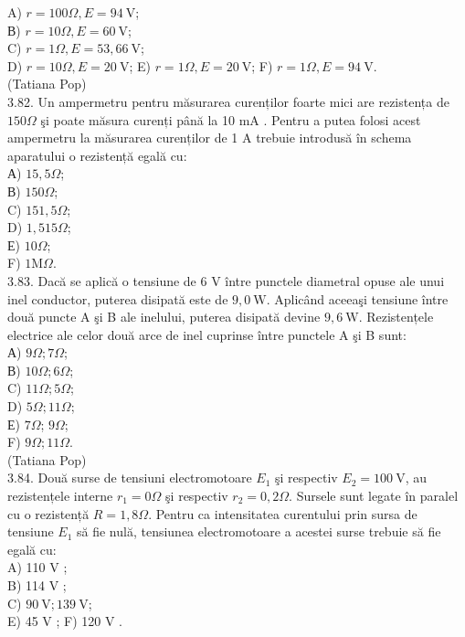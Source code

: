 \documentclass[10pt]{article}
\begin{document}
A) $r=100 \Omega, E=94 \mathrm{~V}$;\\
В) $r=10 \Omega, E=60 \mathrm{~V}$;\\
C) $r=1 \Omega, E=53,66 \mathrm{~V}$;\\
D) $r=10 \Omega, E=20 \mathrm{~V}$; E) $r=1 \Omega, E=20 \mathrm{~V}$; F) $r=1 \Omega, E=94 \mathrm{~V}$.\\
(Tatiana Pop)\\
3.82. Un ampermetru pentru măsurarea curenților foarte mici are rezistența de $150 \Omega$ şi poate măsura curenți până la 10 mA . Pentru a putea folosi acest ampermetru la măsurarea curenților de 1 A trebuie introdusă în schema aparatului o rezistență egală cu:\\
А) $15,5 \Omega$;\\
В) $150 \Omega$;\\
C) $151,5 \Omega$;\\
D) $1,515 \Omega$;\\
Е) $10 \Omega$;\\
F) $1 \mathrm{M} \Omega$.\\
3.83. Dacă se aplică o tensiune de 6 V între punctele diametral opuse ale unui inel conductor, puterea disipată este de $9,0 \mathrm{~W}$. Aplicând aceeaşi tensiune între două puncte A şi B ale inelului, puterea disipată devine $9,6 \mathrm{~W}$. Rezistențele electrice ale celor două arce de inel cuprinse între punctele A şi B sunt:\\
А) $9 \Omega ; 7 \Omega$;\\
В) $10 \Omega ; 6 \Omega$;\\
C) $11 \Omega ; 5 \Omega$;\\
D) $5 \Omega ; 11 \Omega$;\\
Е) $7 \Omega$; $9 \Omega$;\\
F) $9 \Omega ; 11 \Omega$.\\
(Tatiana Pop)\\
3.84. Două surse de tensiuni electromotoare $E_{1}$ şi respectiv $E_{2}=100 \mathrm{~V}$, au rezistențele interne $r_{1}=0 \Omega$ şi respectiv $r_{2}=0,2 \Omega$. Sursele sunt legate în paralel cu o rezistență $R=1,8 \Omega$. Pentru ca intensitatea curentului prin sursa de tensiune $E_{1}$ să fie nulă, tensiunea electromotoare a acestei surse trebuie să fie egală cu:\\
A) 110 V ;\\
B) 114 V ;\\
C) $90 \mathrm{~V} ; 139 \mathrm{~V}$;\\
E) 45 V ; F) 120 V .\\
\end{document}

